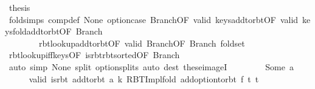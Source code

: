 \begin{isabellebody}
\ {\isacharquery}{\kern0pt}thesis\isanewline
\ \ \ \ \ \ \isamarkupfalse%
\ fold{\isacharunderscore}{\kern0pt}simps\ comp{\isacharunderscore}{\kern0pt}def\ None\ option{\isachardot}{\kern0pt}case{\isacharparenleft}{\kern0pt}{}{\isacharparenright}{\kern0pt}\ Branch{\isacharparenleft}{\kern0pt}{}{\isacharparenright}{\kern0pt}{\isacharbrackleft}{\kern0pt}OF\ valid{\isacharbrackright}{\kern0pt}\ keys{\isacharunderscore}{\kern0pt}add{\isacharunderscore}{\kern0pt}to{\isacharunderscore}{\kern0pt}rbt{\isacharbrackleft}{\kern0pt}OF\ valid{\isacharbrackright}{\kern0pt}\ keys{\isacharunderscore}{\kern0pt}fold{\isacharunderscore}{\kern0pt}add{\isacharunderscore}{\kern0pt}to{\isacharunderscore}{\kern0pt}rbt{\isacharbrackleft}{\kern0pt}OF\ Branch{\isacharparenleft}{\kern0pt}{}{\isacharparenright}{\kern0pt}{\isacharbrackright}{\kern0pt}\isanewline
\ \ \ \ \ \ \ \ rbt{\isacharunderscore}{\kern0pt}lookup{\isacharunderscore}{\kern0pt}add{\isacharunderscore}{\kern0pt}to{\isacharunderscore}{\kern0pt}rbt{\isacharbrackleft}{\kern0pt}OF\ valid{\isacharbrackright}{\kern0pt}\ Branch{\isacharparenleft}{\kern0pt}{}{\isacharparenright}{\kern0pt}{\isacharbrackleft}{\kern0pt}OF\ Branch{\isacharparenleft}{\kern0pt}{}{\isacharparenright}{\kern0pt}{\isacharbrackright}{\kern0pt}\ fold{\isacharunderscore}{\kern0pt}set\isanewline
\ \ \ \ \ \ \isamarkupfalse%
\ rbt{\isacharunderscore}{\kern0pt}lookup{\isacharunderscore}{\kern0pt}iff{\isacharunderscore}{\kern0pt}keys{\isacharparenleft}{\kern0pt}{}{\isacharcomma}{\kern0pt}{}{\isacharparenright}{\kern0pt}{\isacharbrackleft}{\kern0pt}OF\ is{\isacharunderscore}{\kern0pt}rbt{\isacharunderscore}{\kern0pt}rbt{\isacharunderscore}{\kern0pt}sorted{\isacharbrackleft}{\kern0pt}OF\ Branch{\isacharparenleft}{\kern0pt}{}{\isacharparenright}{\kern0pt}{\isacharbrackright}{\kern0pt}{\isacharbrackright}{\kern0pt}\isanewline
\ \ \ \ \ \ \isamarkupfalse%
\ {\isacharparenleft}{\kern0pt}auto\ simp{\isacharcolon}{\kern0pt}\ None\ split{\isacharcolon}{\kern0pt}\ option{\isachardot}{\kern0pt}splits{\isacharparenright}{\kern0pt}\ {\isacharparenleft}{\kern0pt}auto\ dest{\isacharcolon}{\kern0pt}\ these{\isacharunderscore}{\kern0pt}imageI{\isacharparenright}{\kern0pt}\isanewline
\ \ \isamarkupfalse%
\isanewline
\ \ \ \ \isamarkupfalse%
\ {\isacharparenleft}{\kern0pt}Some\ a{\isacharparenright}{\kern0pt}\isanewline
\ \ \ \ \isamarkupfalse%
\ valid{\isacharprime}{\kern0pt}{\isacharcolon}{\kern0pt}\ {\isachardoublequoteopen}is{\isacharunderscore}{\kern0pt}rbt\ {\isacharparenleft}{\kern0pt}add{\isacharunderscore}{\kern0pt}to{\isacharunderscore}{\kern0pt}rbt\ {\isacharparenleft}{\kern0pt}a{\isacharcomma}{\kern0pt}\ k{\isacharparenright}{\kern0pt}\ {\isacharparenleft}{\kern0pt}RBT{\isacharunderscore}{\kern0pt}Impl{\isachardot}{\kern0pt}fold\ {\isacharparenleft}{\kern0pt}add{\isacharunderscore}{\kern0pt}option{\isacharunderscore}{\kern0pt}to{\isacharunderscore}{\kern0pt}rbt\ f{\isacharparenright}{\kern0pt}\ t{}\ t{\isacharprime}{\kern0pt}{\isacharparenright}{\kern0pt}{\isacharparenright}{\kern0pt}{\isachardoublequoteclose}\isanewline

\end{isabellebody}
